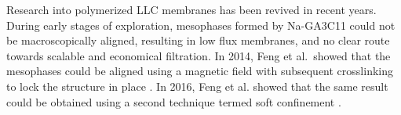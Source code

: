 \documentclass{article}
\begin{document}
  Research into polymerized LLC membranes has been revived in recent years. During early
  stages of exploration, mesophases formed by Na-GA3C11 could not be
  macroscopically aligned, resulting in low flux membranes, and no clear route
  towards scalable and economical filtration. In 2014, Feng et al.~showed that
  the mesophases could be aligned using a magnetic field with subsequent
  crosslinking to lock the structure in place \cite{feng_scalable_2014}. In 2016,
  Feng et al. showed that the same result could be obtained using a second technique
  termed soft confinement \cite{feng_thin_2016}.


\end{document}
